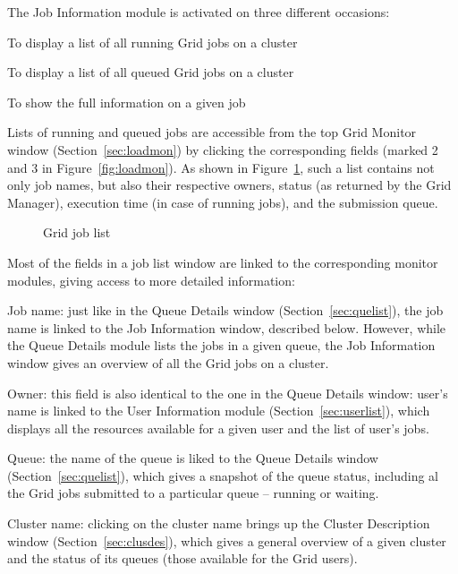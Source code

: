 \documentclass{article}
\begin{document}
The Job Information module is activated on three different occasions:
\begin{list}{--}{\itemsep=-0.5mm}
\item To display a list of all running Grid jobs
   on a cluster
\item To display a list of all queued  Grid
  jobs on a cluster
\item To show the full information on a given job
\end{list}

Lists of running and queued jobs  are
accessible from the top Grid Monitor window
(Section~\ref{sec:loadmon}) by clicking the corresponding fields
(marked 2 and 3 in Figure~\ref{fig:loadmon}).  As shown in
Figure~\ref{fig:jobstat2}, such a list contains not only job names,
but also their respective owners, status (as returned by the Grid
Manager), execution time (in case of running jobs), and the submission
queue.

\begin{figure}[hb]
\caption{\label{fig:jobstat2}Grid job list}
\end{figure}

Most of the fields in a job list window are linked to the corresponding
monitor modules, giving access to more detailed information:
\begin{list}{)}{ \itemsep=-0.5mm}
\item \textsf{Job name}: just like in the Queue Details window
  (Section~\ref{sec:quelist}), the job name is linked to the Job
  Information window, described below. However, while the Queue
  Details module lists the jobs in a given queue, the Job Information
  window gives an overview of all the Grid jobs on a cluster.
\item \textsf{Owner}: this field is also identical to the one in the
  Queue Details window: user's name is linked to the User Information
  module (Section~\ref{sec:userlist}), which displays all the
  resources available for a given user and the list of user's jobs.
\item \textsf{Queue}: the name of the queue is liked to the Queue
  Details window (Section~\ref{sec:quelist}), which gives a snapshot
  of the queue status, including al the Grid jobs submitted to a
  particular queue -- running or waiting.
\item \textsf{Cluster name}: clicking on the cluster name brings up
  the Cluster Description window (Section~\ref{sec:clusdes}), which
  gives a general overview of a given cluster and the status of its
  queues (those available for the Grid users).
\end{list}
\end{document}
